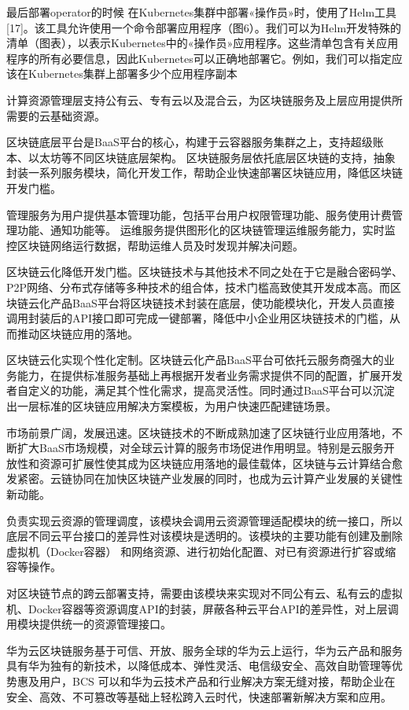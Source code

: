 最后部署operator的时候
在Kubernetes集群中部署«操作员»时，使用了Helm工具[17]。该工具允许使用一个命令部署应用程序（图6）。我们可以为Helm开发特殊的清单（图表），以表示Kubernetes中的«操作员»应用程序。这些清单包含有关应用程序的所有必要信息，因此Kubernetes可以正确地部署它。例如，我们可以指定应该在Kubernetes集群上部署多少个应用程序副本

计算资源管理层支持公有云、专有云以及混合云，为区块链服务及上层应用提供所需要的云基础资源。

区块链底层平台是BaaS平台的核心，构建于云容器服务集群之上，支持超级账本、以太坊等不同区块链底层架构。
区块链服务层依托底层区块链的支持，抽象封装一系列服务模块，简化开发工作，帮助企业快速部署区块链应用，降低区块链开发门槛。

管理服务为用户提供基本管理功能，包括平台用户权限管理功能、服务使用计费管理功能、通知功能等。
运维服务提供图形化的区块链管理运维服务能力，实时监控区块链网络运行数据，帮助运维人员及时发现并解决问题。

区块链云化降低开发门槛。区块链技术与其他技术不同之处在于它是融合密码学、P2P网络、分布式存储等多种技术的组合体，技术门槛高致使其开发成本高。而区块链云化产品BaaS平台将区块链技术封装在底层，使功能模块化，开发人员直接调用封装后的API接口即可完成一键部署，降低中小企业用区块链技术的门槛，从而推动区块链应用的落地。

区块链云化实现个性化定制。区块链云化产品BaaS平台可依托云服务商强大的业务能力，在提供标准服务基础上再根据开发者业务需求提供不同的配置，扩展开发者自定义的功能，满足其个性化需求，提高灵活性。同时通过BaaS平台可以沉淀出一层标准的区块链应用解决方案模板，为用户快速匹配建链场景。

市场前景广阔，发展迅速。区块链技术的不断成熟加速了区块链行业应用落地，不断扩大BaaS市场规模，对全球云计算的服务市场促进作用明显。特别是云服务开放性和资源可扩展性使其成为区块链应用落地的最佳载体，区块链与云计算结合愈发紧密。云链协同在加快区块链产业发展的同时，也成为云计算产业发展的关键性新动能。

负责实现云资源的管理调度，该模块会调用云资源管理适配模块的统一接口，所以底层不同云平台接口的差异性对该模块是透明的。该模块的主要功能有创建及删除虚拟机（Docker容器） 和网络资源、进行初始化配置、对已有资源进行扩容或缩容等操作。

对区块链节点的跨云部署支持，需要由该模块来实现对不同公有云、私有云的虚拟机、Docker容器等资源调度API的封装，屏蔽各种云平台API的差异性，对上层调用模块提供统一的资源管理接口。

华为云区块链服务基于可信、开放、服务全球的华为云上运行，华为云产品和服务具有华为独有的新技术，以降低成本、弹性灵活、电信级安全、高效自助管理等优势惠及用户，BCS 可以和华为云技术产品和行业解决方案无缝对接，帮助企业在安全、高效、不可篡改等基础上轻松跨入云时代，快速部署新解决方案和应用。


